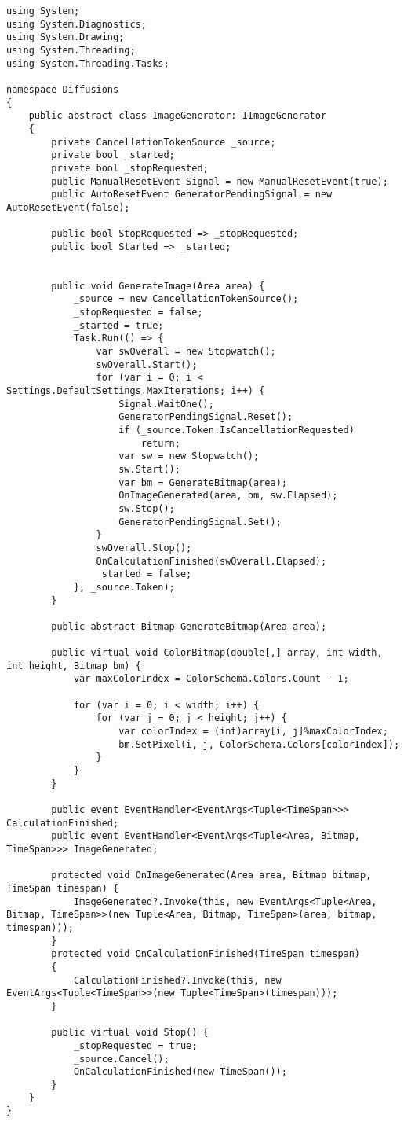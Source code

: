 \documentclass[a4paper,ngerman]{scrartcl}
\begin{document}
\begin{lstlisting}
using System;
using System.Diagnostics;
using System.Drawing;
using System.Threading;
using System.Threading.Tasks;

namespace Diffusions
{
    public abstract class ImageGenerator: IImageGenerator
    {
        private CancellationTokenSource _source;
        private bool _started;
        private bool _stopRequested;
        public ManualResetEvent Signal = new ManualResetEvent(true);
        public AutoResetEvent GeneratorPendingSignal = new AutoResetEvent(false);

        public bool StopRequested => _stopRequested;
        public bool Started => _started;
        

        public void GenerateImage(Area area) {
            _source = new CancellationTokenSource();
            _stopRequested = false;
            _started = true;
            Task.Run(() => {
                var swOverall = new Stopwatch();
                swOverall.Start();
                for (var i = 0; i < Settings.DefaultSettings.MaxIterations; i++) {
                    Signal.WaitOne();
                    GeneratorPendingSignal.Reset();
                    if (_source.Token.IsCancellationRequested)
                        return;
                    var sw = new Stopwatch();
                    sw.Start();
                    var bm = GenerateBitmap(area);
                    OnImageGenerated(area, bm, sw.Elapsed);
                    sw.Stop();
                    GeneratorPendingSignal.Set();
                }
                swOverall.Stop();
                OnCalculationFinished(swOverall.Elapsed);
                _started = false;
            }, _source.Token);
        }

        public abstract Bitmap GenerateBitmap(Area area);

        public virtual void ColorBitmap(double[,] array, int width, int height, Bitmap bm) {
            var maxColorIndex = ColorSchema.Colors.Count - 1;

            for (var i = 0; i < width; i++) {
                for (var j = 0; j < height; j++) {
                    var colorIndex = (int)array[i, j]%maxColorIndex;
                    bm.SetPixel(i, j, ColorSchema.Colors[colorIndex]);
                }
            }
        }

        public event EventHandler<EventArgs<Tuple<TimeSpan>>> CalculationFinished;
        public event EventHandler<EventArgs<Tuple<Area, Bitmap, TimeSpan>>> ImageGenerated;

        protected void OnImageGenerated(Area area, Bitmap bitmap, TimeSpan timespan) {
            ImageGenerated?.Invoke(this, new EventArgs<Tuple<Area, Bitmap, TimeSpan>>(new Tuple<Area, Bitmap, TimeSpan>(area, bitmap, timespan)));
        }
        protected void OnCalculationFinished(TimeSpan timespan)
        {
            CalculationFinished?.Invoke(this, new EventArgs<Tuple<TimeSpan>>(new Tuple<TimeSpan>(timespan)));
        }

        public virtual void Stop() {
            _stopRequested = true;
            _source.Cancel();
            OnCalculationFinished(new TimeSpan());
        }
    }
}
\end{lstlisting}
\end{document}
